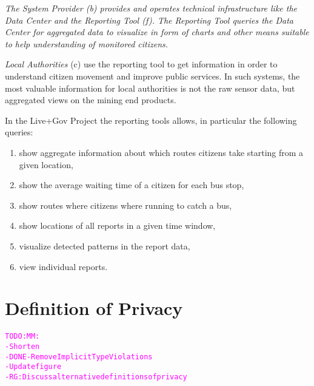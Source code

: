 \documentclass[runningheads,a4paper]{llncs}
\newcommand{\TODO}[1]{\begin{alltt}\textcolor{magenta}{TODO: #1}\end{alltt}}
\newenvironment{LGContent}
{ \par\color{blue} \it \small }
{ \par }
\begin{document}
\begin{LGContent}
The \emph{System Provider} (b) provides and operates technical infrastructure like the Data Center and the \emph{Reporting Tool} (f).
The Reporting Tool queries the Data Center for aggregated data to visualize in form of charts and other means suitable to help understanding of monitored citizens.

\textit{Local Authorities} (c) use the reporting tool to get information in order to understand citizen movement and improve public services.
In such systems, the most valuable information for local authorities is not the raw sensor data, but aggregated views on the mining end products.

In the Live+Gov Project the reporting tools allows, in particular the following queries:
\begin{enumerate}
\item show aggregate information about which routes citizens take starting from a given location,
\item show the average waiting time of a citizen for each bus stop,
\item show routes where citizens where running to catch a bus,
\item show locations of all reports in a given time window,
\item visualize detected patterns in the report data,
\item view individual reports.
\end{enumerate}
\end{LGContent}



\section{Definition of Privacy}

\TODO{MM:\\
- Shorten\\
- DONE - Remove Implicit Type Violations\\
- Update figure\\
- RG: Discuss alternative definitions of privacy\\
}
\end{document}
